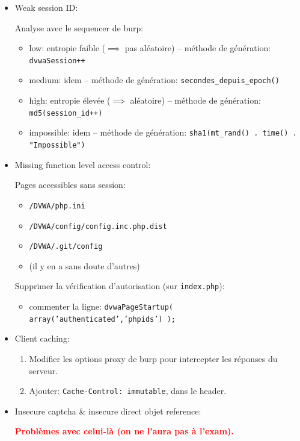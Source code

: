 \documentclass[a4paper]{article}
\begin{document}
\begin{itemize}
\item Weak session ID:
\begin{example}
    Analyse avec le sequencer de burp:
    \begin{itemize}
        \item low: entropie faible ($\implies$ pas aléatoire) -- méthode de génération: \texttt{dvwaSession++}
        \item medium: idem -- méthode de génération: \texttt{secondes\_depuis\_epoch()}
        \item high: entropie élevée ($\implies$ aléatoire) -- méthode de génération: \texttt{md5(session\_id++)}
        \item impossible: idem -- méthode de génération: \texttt{sha1(mt\_rand() . time() . "Impossible")}
    \end{itemize}
\end{example}


\item Missing function level access control:
\begin{example}
    Pages accessibles sans session:
    \begin{itemize}
        \item \texttt{/DVWA/php.ini}
        \item \texttt{/DVWA/config/config.inc.php.dist}
        \item \texttt{/DVWA/.git/config}
        \item (il y en a sans doute d'autres)
    \end{itemize}
    Supprimer la vérification d'autorisation (sur \texttt{index.php}):
    \begin{itemize}
        \item commenter la ligne: \texttt{dvwaPageStartup( array('authenticated','phpids') );}
    \end{itemize}
\end{example}


\item Client caching:
\begin{example} \begin{enumerate}
    \item Modifier les options proxy de burp pour intercepter les réponses du serveur.
    \item Ajouter: \texttt{Cache-Control: immutable}, dans le header.
\end{enumerate} \end{example}


\item Insecure captcha \& insecure direct objet reference:
\begin{example}
    \textcolor{red}{\textbf{Problèmes avec celui-là (on ne l'aura pas à l'exam).}}
\end{example}



\end{itemize}
\end{document}
